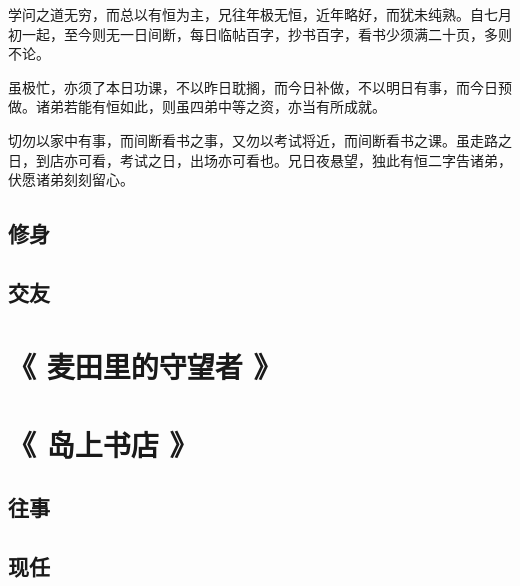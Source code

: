 \documentclass[UTF8,a4paper,8pt]{ctexbook}
\begin{document}
			学问之道无穷，而总以有恒为主，兄往年极无恒，近年略好，而犹未纯熟。自七月初一起，至今则无一日间断，每日临帖百字，抄书百字，看书少须满二十页，多则不论。
			
			虽极忙，亦须了本日功课，不以昨日耽搁，而今日补做，不以明日有事，而今日预做。诸弟若能有恒如此，则虽四弟中等之资，亦当有所成就。
			
			切勿以家中有事，而间断看书之事，又勿以考试将近，而间断看书之课。虽走路之日，到店亦可看，考试之日，出场亦可看也。兄日夜悬望，独此有恒二字告诸弟，伏愿诸弟刻刻留心。
		\subsection{修身}
		\subsection{交友}

	\section{《 麦田里的守望者 》   }	
	
	
	\section{《 岛上书店 》   }	
		\subsection{往事}
			
		\subsection{现任}
		
		
\end{document}
